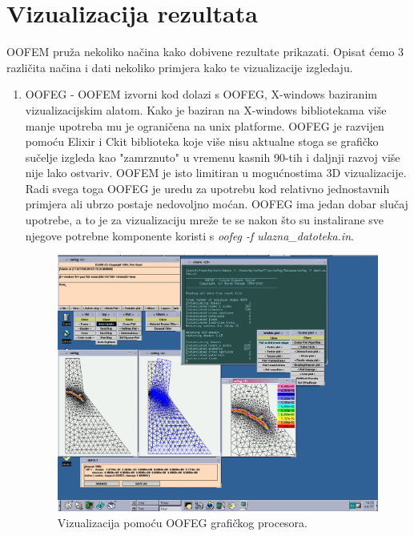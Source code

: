 \documentclass[a4paper,twoside,12pt]{memoir} %
\begin{document}
\section{Vizualizacija rezultata}
OOFEM pruža nekoliko načina kako dobivene rezultate prikazati. Opisat ćemo 3 različita načina i dati nekoliko primjera kako te vizualizacije izgledaju.
\begin{enumerate}
    \item OOFEG - OOFEM izvorni kod dolazi s OOFEG, X-windows baziranim vizualizacijskim alatom. Kako je baziran na X-windows bibliotekama više manje upotreba mu je ograničena na unix platforme. OOFEG je razvijen pomoću Elixir i Ckit biblioteka koje više nisu aktualne stoga se grafičko sučelje izgleda kao "zamrznuto" u vremenu kasnih 90-tih i daljnji razvoj više nije lako ostvariv. OOFEM je isto limitiran u mogućnostima 3D vizualizacije. Radi svega toga OOFEG je uredu za upotrebu kod relativno jednostavnih primjera ali ubrzo postaje nedovoljno moćan. OOFEG ima jedan dobar slučaj upotrebe, a to je za vizualizaciju mreže te se nakon što su instalirane sve njegove potrebne komponente koristi s \textit{oofeg -f ulazna\_datoteka.in}. 
        \begin{figure}[h!t]
        \begin{center}
        \includegraphics[scale=0.3]{pictures/chapter_oofem/oofeg_koyna_dam.png}
        \caption{Vizualizacija pomoću OOFEG grafičkog procesora. \cite{oofem-web}}
        \label{fig:oofeg_example}
        \end{center}
        \end{figure}

\end{enumerate}
\end{document}

